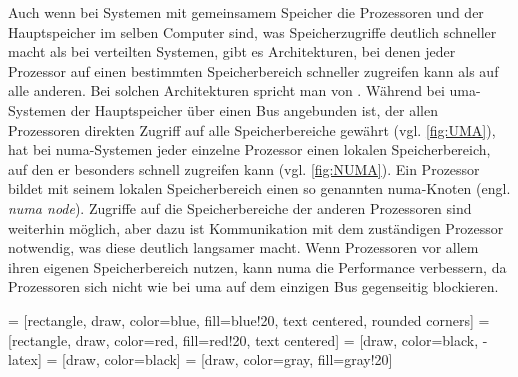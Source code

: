 Auch wenn bei Systemen mit gemeinsamem Speicher die Prozessoren und der Hauptspeicher im selben Computer sind,
was Speicherzugriffe deutlich schneller macht
als bei verteilten Systemen,
gibt es Architekturen,
bei denen jeder Prozessor auf einen bestimmten Speicherbereich schneller zugreifen kann
als auf alle anderen.
Bei solchen Architekturen spricht man von  \cite{NUMA}.
Während bei \gls{uma}-Systemen
der Hauptspeicher über einen Bus angebunden ist,
der allen Prozessoren direkten Zugriff auf alle Speicherbereiche gewährt
(vgl. \autoref{fig:UMA}),
hat bei \gls{numa}-Systemen jeder einzelne Prozessor einen lokalen Speicherbereich,
auf den er besonders schnell zugreifen kann
(vgl. \autoref{fig:NUMA}).
Ein Prozessor bildet mit seinem lokalen Speicherbereich einen so genannten \gls{numa}-Knoten (engl. \textit{\gls{numa} node}).
Zugriffe auf die Speicherbereiche der anderen Prozessoren sind weiterhin möglich,
aber dazu ist Kommunikation mit dem zuständigen Prozessor notwendig,
was diese deutlich langsamer macht.
Wenn Prozessoren vor allem ihren eigenen Speicherbereich nutzen,
kann \gls{numa} die Performance verbessern,
da Prozessoren sich nicht wie bei \gls{uma} auf dem einzigen Bus gegenseitig blockieren.

 = [rectangle, draw, color=blue, fill=blue!20, text centered, rounded corners]
 = [rectangle, draw, color=red, fill=red!20, text centered]
 = [draw, color=black, -latex]
 = [draw, color=black]
 = [draw, color=gray, fill=gray!20]

